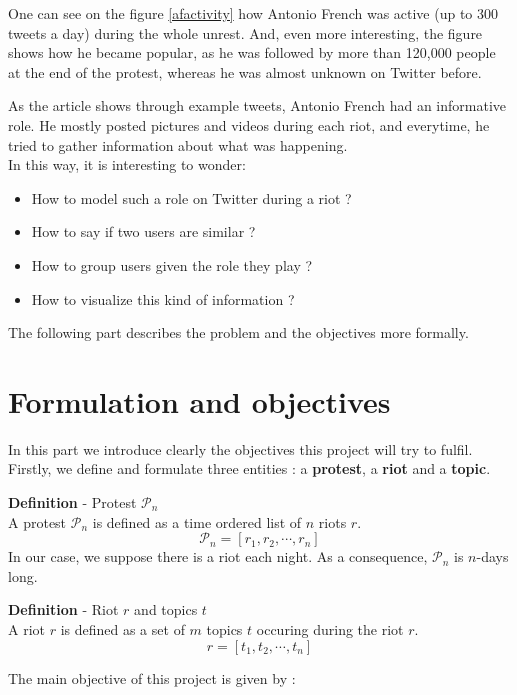 \documentclass[a4paper,twoside,12pt,openright]{report}
\begin{document}
One can see on the figure \ref{afactivity} how Antonio French was active (up to 300 tweets a day) during the whole unrest. And, even more interesting, the figure shows how he became popular, as he was followed by more than 120,000 people at the end of the protest, whereas he was almost unknown on Twitter before. 

As the article shows through example tweets, Antonio French had an informative role. He mostly posted pictures and videos during each riot, and everytime, he tried to gather information about what was happening.\\
In this way, it is interesting to wonder:
\begin{itemize}
\vspace*{-0.2cm}
\setlength\itemsep{0em}
\item How to model such a role on Twitter during a riot ?
\item How to say if two users are similar ?
\item How to group users given the role they play ?
\item How to visualize this kind of information ?
\end{itemize}

The following part describes the problem and the objectives more formally.
\newpage

\section{Formulation and objectives}

In this part we introduce clearly the objectives this project will try to fulfil. \\
Firstly, we define and formulate three entities : a \textbf{protest}, a \textbf{riot} and a \textbf{topic}.

\begin{defbox}
\textbf{Definition} - Protest $\mathcal{P}_n$\\
A protest $\mathcal{P}_n$ is defined as a time ordered list of $n$ riots $r$.
$$ \mathcal{P}_n = [r_1, r_2, \cdots, r_n]$$
In our case, we suppose there is a riot each night. As a consequence, $\mathcal{P}_n$ is $n$-days long.
\end{defbox}

\begin{defbox}
\textbf{Definition} - Riot $r$ and topics $t$\\
A riot $r$ is defined as a set of $m$ topics $t$ occuring during the riot $r$.
$$ r = [t_1, t_2, \cdots, t_n]$$
\end{defbox}
The main objective of this project is given by :
\end{document}
